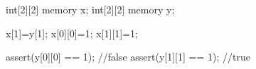 \begin{soliditybox}
int[2][2] memory x;
int[2][2] memory y;

x[1]=y[1];
x[0][0]=1;
x[1][1]=1;

assert(y[0][0] == 1); //false
assert(y[1][1] == 1); //true
\end{soliditybox}